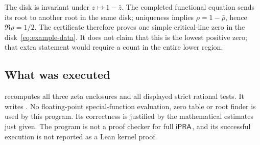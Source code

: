 The disk is invariant under $z\mapsto1-\bar z$. The completed
functional equation sends its root to another root in the same disk;
uniqueness implies $\rho=1-\bar\rho$, hence $\Re\rho=1/2$.
The certificate therefore proves one simple critical-line zero in
the disk~\eqref{eq:example-data}. It does not claim that this is the
lowest positive zero; that extra statement would require a count in
the entire lower region.

\subsection{What was executed}
 recomputes all three zeta
enclosures and all displayed strict rational tests. It writes
. No floating-point special-function
evaluation, zero table or root finder is used by this program.
Its correctness is justified by the mathematical estimates just given.
The program is not a proof checker for full $\mathsf{iPRA}$, and its successful
execution is not reported as a Lean kernel proof.

